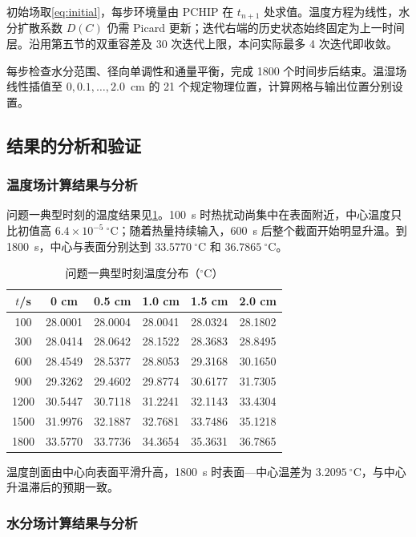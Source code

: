 初始场取\cref{eq:initial}，每步环境量由 PCHIP 在 $t_{n+1}$ 处求值。温度方程为线性，水分扩散系数 $D(C)$ 仍需 Picard 更新；迭代右端的历史状态始终固定为上一时间层。沿用第五节的双重容差及 30 次迭代上限，本问实际最多 4 次迭代即收敛。

每步检查水分范围、径向单调性和通量平衡，完成 1800 个时间步后结束。温湿场线性插值至 $0,0.1,\ldots,2.0$~cm 的 21 个规定物理位置，计算网格与输出位置分别设置。

\subsection{结果的分析和验证}

\subsubsection{温度场计算结果与分析}

问题一典型时刻的温度结果见\cref{tab:q1t}。100~s 时热扰动尚集中在表面附近，中心温度只比初值高 $6.4\times10^{-5}~{}^\circ\mathrm C$；随着热量持续输入，600~s 后整个截面开始明显升温。到 1800~s，中心与表面分别达到 $33.5770~{}^\circ\mathrm C$ 和 $36.7865~{}^\circ\mathrm C$。

\begin{table}[!htbp]
\centering
\caption{问题一典型时刻温度分布（$^\circ$C）}\label{tab:q1t}
\begin{tabular}{cccccc}
\toprule
$t$/s & 0 cm & 0.5 cm & 1.0 cm & 1.5 cm & 2.0 cm\\
\midrule
100&28.0001&28.0004&28.0041&28.0324&28.1802\\
300&28.0414&28.0642&28.1522&28.3683&28.8495\\
600&28.4549&28.5377&28.8053&29.3168&30.1650\\
900&29.3262&29.4602&29.8774&30.6177&31.7305\\
1200&30.5447&30.7118&31.2241&32.1143&33.4304\\
1500&31.9976&32.1887&32.7681&33.7486&35.1218\\
1800&33.5770&33.7736&34.3654&35.3631&36.7865\\
\bottomrule
\end{tabular}
\end{table}

温度剖面由中心向表面平滑升高，1800~s 时表面—中心温差为 $3.2095~{}^\circ\mathrm C$，与中心升温滞后的预期一致。

\subsubsection{水分场计算结果与分析}

